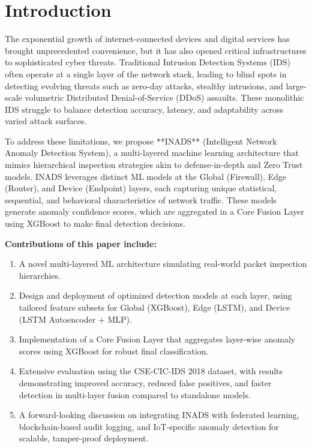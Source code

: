 \documentclass[conference]{IEEEtran}
\begin{document}
\section{Introduction}

The exponential growth of internet-connected devices and digital services has brought unprecedented convenience, but it has also opened critical infrastructures to sophisticated cyber threats. Traditional Intrusion Detection Systems (IDS) often operate at a single layer of the network stack, leading to blind spots in detecting evolving threats such as zero-day attacks, stealthy intrusions, and large-scale volumetric Distributed Denial-of-Service (DDoS) assaults. These monolithic IDS struggle to balance detection accuracy, latency, and adaptability across varied attack surfaces.

To address these limitations, we propose **INADS** (Intelligent Network Anomaly Detection System), a multi-layered machine learning architecture that mimics hierarchical inspection strategies akin to defense-in-depth and Zero Trust models. INADS leverages distinct ML models at the Global (Firewall), Edge (Router), and Device (Endpoint) layers, each capturing unique statistical, sequential, and behavioral characteristics of network traffic. These models generate anomaly confidence scores, which are aggregated in a Core Fusion Layer using XGBoost to make final detection decisions.

\textbf{Contributions of this paper include:}
\begin{enumerate}
    \item A novel multi-layered ML architecture simulating real-world packet inspection hierarchies.
    \item Design and deployment of optimized detection models at each layer, using tailored feature subsets for Global (XGBoost), Edge (LSTM), and Device (LSTM Autoencoder + MLP).
    \item Implementation of a Core Fusion Layer that aggregates layer-wise anomaly scores using XGBoost for robust final classification.
    \item Extensive evaluation using the CSE-CIC-IDS 2018 dataset, with results demonstrating improved accuracy, reduced false positives, and faster detection in multi-layer fusion compared to standalone models.
    \item A forward-looking discussion on integrating INADS with federated learning, blockchain-based audit logging, and IoT-specific anomaly detection for scalable, tamper-proof deployment.
\end{enumerate}
\end{document}
